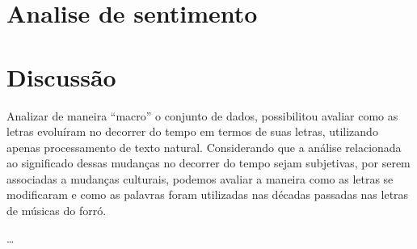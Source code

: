 \documentclass[]{article}
\newenvironment{Shaded}{\begin{snugshade}}{\end{snugshade}}
\newcommand{\DataTypeTok}[1]{\textcolor[rgb]{0.13,0.29,0.53}{#1}}
\newcommand{\DecValTok}[1]{\textcolor[rgb]{0.00,0.00,0.81}{#1}}
\newcommand{\FloatTok}[1]{\textcolor[rgb]{0.00,0.00,0.81}{#1}}
\newcommand{\KeywordTok}[1]{\textcolor[rgb]{0.13,0.29,0.53}{\textbf{#1}}}
\newcommand{\NormalTok}[1]{#1}
\newcommand{\OperatorTok}[1]{\textcolor[rgb]{0.81,0.36,0.00}{\textbf{#1}}}
\newcommand{\StringTok}[1]{\textcolor[rgb]{0.31,0.60,0.02}{#1}}
\begin{document}
\begin{Shaded}
\end{Shaded}

\hypertarget{analise-de-sentimento}{%
\section{Analise de sentimento }\label{analise-de-sentimento}}

\hypertarget{discussao}{%
\section{Discussão}\label{discussao}}

Analizar de maneira ``macro'' o conjunto de dados, possibilitou avaliar
como as letras evoluíram no decorrer do tempo em termos de suas letras,
utilizando apenas processamento de texto natural. Considerando que a
análise relacionada ao significado dessas mudanças no decorrer do tempo
sejam subjetivas, por serem associadas a mudanças culturais, podemos
avaliar a maneira como as letras se modificaram e como as palavras foram
utilizadas nas décadas passadas nas letras de músicas do forró.

\ldots{}
\end{document}
